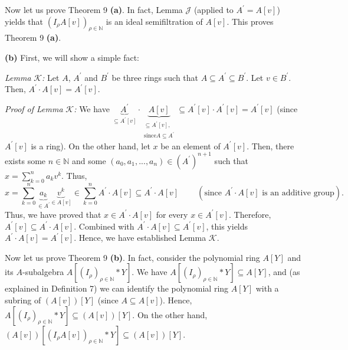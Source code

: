 \documentclass[12pt,final,notitlepage,onecolumn]{article}%
\begin{document}
Now let us prove Theorem 9 \textbf{(a)}. In fact, Lemma $\mathcal{J}$ (applied
to $A^{\prime}=A\left[  v\right]  $) yields that $\left(  I_{\rho}A\left[
v\right]  \right)  _{\rho\in\mathbb{N}}$ is an ideal semifiltration of
$A\left[  v\right]  $. This proves Theorem 9 \textbf{(a)}.

\textbf{(b)} First, we will show a simple fact:

\textit{Lemma }$\mathcal{K}$\textit{:} Let $A$, $A^{\prime}$ and $B^{\prime}$
be three rings such that $A\subseteq A^{\prime}\subseteq B^{\prime}$. Let
$v\in B^{\prime}$. Then, $A^{\prime}\cdot A\left[  v\right]  =A^{\prime
}\left[  v\right]  $.

\textit{Proof of Lemma }$\mathcal{K}$\textit{:} We have $\underbrace
{A^{\prime}}_{\subseteq A^{\prime}\left[  v\right]  }\cdot\underbrace{A\left[
v\right]  }_{\substack{\subseteq A^{\prime}\left[  v\right]  ,\\\text{since
}A\subseteq A^{\prime}}}\subseteq A^{\prime}\left[  v\right]  \cdot A^{\prime
}\left[  v\right]  =A^{\prime}\left[  v\right]  $ (since $A^{\prime}\left[
v\right]  $ is a ring). On the other hand, let $x$ be an element of
$A^{\prime}\left[  v\right]  $. Then, there exists some $n\in\mathbb{N}$ and
some $\left(  a_{0},a_{1},...,a_{n}\right)  \in\left(  A^{\prime}\right)
^{n+1}$ such that $x=\sum\limits_{k=0}^{n}a_{k}v^{k}$. Thus,%
\[
x=\sum\limits_{k=0}^{n}\underbrace{a_{k}}_{\in A^{\prime}}\underbrace{v^{k}%
}_{\in A\left[  v\right]  }\in\sum\limits_{k=0}^{n}A^{\prime}\cdot A\left[
v\right]  \subseteq A^{\prime}\cdot A\left[  v\right]
\ \ \ \ \ \ \ \ \ \ \left(  \text{since }A^{\prime}\cdot A\left[  v\right]
\text{ is an additive group}\right)  .
\]
Thus, we have proved that $x\in A^{\prime}\cdot A\left[  v\right]  $ for every
$x\in A^{\prime}\left[  v\right]  $. Therefore, $A^{\prime}\left[  v\right]
\subseteq A^{\prime}\cdot A\left[  v\right]  $. Combined with $A^{\prime}\cdot
A\left[  v\right]  \subseteq A^{\prime}\left[  v\right]  $, this yields
$A^{\prime}\cdot A\left[  v\right]  =A^{\prime}\left[  v\right]  $. Hence, we
have established Lemma $\mathcal{K}$.

Now let us prove Theorem 9 \textbf{(b)}. In fact, consider the polynomial ring
$A\left[  Y\right]  $ and its $A$-subalgebra $A\left[  \left(  I_{\rho
}\right)  _{\rho\in\mathbb{N}}\ast Y\right]  $. We have $A\left[  \left(
I_{\rho}\right)  _{\rho\in\mathbb{N}}\ast Y\right]  \subseteq A\left[
Y\right]  $, and (as explained in Definition 7) we can identify the polynomial
ring $A\left[  Y\right]  $ with a subring of $\left(  A\left[  v\right]
\right)  \left[  Y\right]  $ (since $A\subseteq A\left[  v\right]  $). Hence,
$A\left[  \left(  I_{\rho}\right)  _{\rho\in\mathbb{N}}\ast Y\right]
\subseteq\left(  A\left[  v\right]  \right)  \left[  Y\right]  $. On the other
hand, $\left(  A\left[  v\right]  \right)  \left[  \left(  I_{\rho}A\left[
v\right]  \right)  _{\rho\in\mathbb{N}}\ast Y\right]  \subseteq\left(
A\left[  v\right]  \right)  \left[  Y\right]  $.
\end{document}
